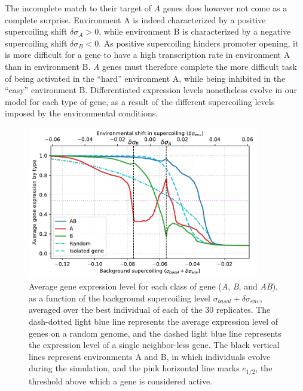 The incomplete match to their target of \emph{A} genes does however not come as a complete surprise.
Environment A is indeed characterized by a positive supercoiling shift $\delta\sigma_A > 0$, while environment B is characterized by a negative supercoiling shift $\delta\sigma_B < 0$.
As positive supercoiling hinders promoter opening, it is more difficult for a gene to have a high transcription rate in environment A than in environment B.
\emph{A} genes must therefore complete the more difficult task of being activated in the ``hard'' environment A, while being inhibited in the ``easy'' environment B.
Differentiated expression levels nonetheless evolve in our model for each type of gene, as a result of the different supercoiling levels imposed by the environmental conditions.

\begin{figure}[H]
\centering
\includegraphics[width=0.9\textwidth]{ploscb/img/activity_sigmas_avg.pdf}
\caption[Average gene expression as a function of background supercoiling at the end of evolution in the advanced model]{Average gene expression level for each class of gene (\emph{A}, \emph{B}, and \emph{AB}), as a function of the background supercoiling level $\sigma_{basal} + \delta\sigma_{env}$, averaged over the best individual of each of the 30 replicates.
The dash-dotted light blue line represents the average expression level of genes on a random genome, and the dashed light blue line represents the expression level of a single neighbor-less gene.
The black vertical lines represent environments A and B, in which individuals evolve during the simulation, and the pink horizontal line marks $e_{1/2}$, the threshold above which a gene is considered active.}
\label{fig:ploscb:activity-by-sigma}
\end{figure}


